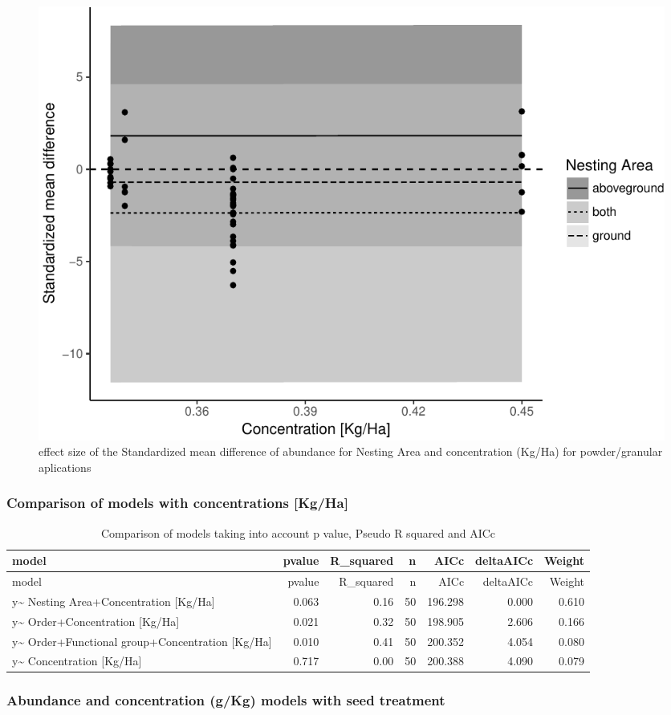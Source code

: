 \documentclass[]{elsarticle} %
\makeatletter
\def\maxwidth{\ifdim\Gin@nat@width>\linewidth\linewidth
\else\Gin@nat@width\fi}
\let\Oldincludegraphics\includegraphics
\renewcommand{\includegraphics}[1]{\Oldincludegraphics[width=\maxwidth]{#1}}
\makeatother
\begin{document}
\begin{figure}[htbp]
\centering
\includegraphics{MetanalysisNeonics_files/figure-latex/unnamed-chunk-8-1.pdf}
\caption{effect size of the Standardized mean difference of abundance
for Nesting Area and concentration (Kg/Ha) for powder/granular
aplications}
\end{figure}

\subsubsection{Comparison of models with concentrations
{[}Kg/Ha{]}}\label{comparison-of-models-with-concentrations-kgha}

\begin{longtable}[c]{@{}lrrrrrr@{}}
\caption{Comparison of models taking into account p value, Pseudo R
squared and AICc}\tabularnewline
\toprule
model & pvalue & R\_squared & n & AICc & deltaAICc &
Weight\tabularnewline
\midrule
\endfirsthead
\toprule
model & pvalue & R\_squared & n & AICc & deltaAICc &
Weight\tabularnewline
\midrule
\endhead
y\textasciitilde{} Nesting Area+Concentration {[}Kg/Ha{]} & 0.063 & 0.16
& 50 & 196.298 & 0.000 & 0.610\tabularnewline
y\textasciitilde{} Order+Concentration {[}Kg/Ha{]} & 0.021 & 0.32 & 50 &
198.905 & 2.606 & 0.166\tabularnewline
y\textasciitilde{} Order+Functional group+Concentration {[}Kg/Ha{]} &
0.010 & 0.41 & 50 & 200.352 & 4.054 & 0.080\tabularnewline
y\textasciitilde{} Concentration {[}Kg/Ha{]} & 0.717 & 0.00 & 50 &
200.388 & 4.090 & 0.079\tabularnewline
\bottomrule
\end{longtable}

\subsubsection{Abundance and concentration (g/Kg) models with seed
treatment}\label{abundance-and-concentration-gkg-models-with-seed-treatment}
\end{document}
